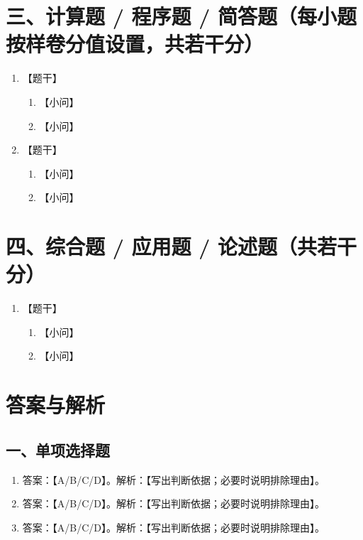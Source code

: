 \documentclass[UTF8,12pt,a4paper]{ctexart}
\begin{document}
\section*{三、计算题 / 程序题 / 简答题（每小题按样卷分值设置，共若干分）}

\begin{enumerate}
\item 【题干】
\begin{enumerate}[label=(\arabic*)]
\item 【小问】
\item 【小问】
\end{enumerate}

\item 【题干】
\begin{enumerate}[label=(\arabic*)]
\item 【小问】
\item 【小问】
\end{enumerate}

\end{enumerate}

\section*{四、综合题 / 应用题 / 论述题（共若干分）}

\begin{enumerate}
\item 【题干】
\begin{enumerate}[label=(\arabic*)]
\item 【小问】
\item 【小问】
\end{enumerate}
\end{enumerate}

\newpage

\section*{答案与解析}

\subsection*{一、单项选择题}
\begin{enumerate}
\item 答案：【A/B/C/D】。解析：【写出判断依据；必要时说明排除理由】。
\item 答案：【A/B/C/D】。解析：【写出判断依据；必要时说明排除理由】。
\item 答案：【A/B/C/D】。解析：【写出判断依据；必要时说明排除理由】。
\end{enumerate}
\end{document}
